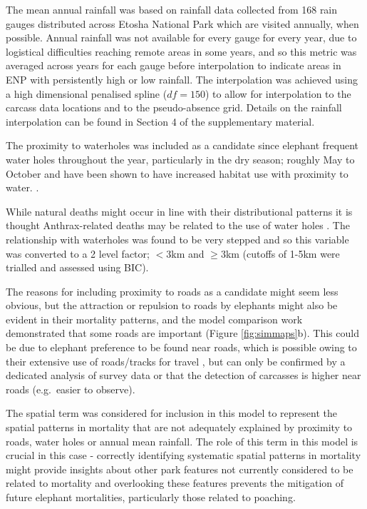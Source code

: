 \documentclass[letterpaper]{interact}
\begin{document}
The mean annual rainfall was based on rainfall data collected from 168 rain gauges distributed across Etosha National Park which are visited annually, when possible. Annual rainfall was not available for every gauge for every year, due to logistical difficulties reaching remote areas in some years, and so this metric was averaged across years for each gauge before interpolation to indicate areas in ENP with persistently high or low rainfall. The interpolation was achieved using a high dimensional penalised spline (\(df=150\)) to allow for interpolation to the carcass data locations and to the pseudo-absence grid. Details on the rainfall interpolation can be found in Section 4 of the supplementary material.

The proximity to waterholes was included as a candidate since elephant frequent water holes throughout the year, particularly in the dry season; roughly May to October \cite{Tsalyuk2019} and have been shown to have increased habitat use with proximity to water. \cite{Harris2008}.

While natural deaths might occur in line with their distributional patterns it is thought Anthrax-related deaths may be related to the use of water holes \cite{zidon2017}. The relationship with waterholes was found to be very stepped and so this variable was converted to a 2 level factor; $<3$km and $\geq 3$km (cutoffs of 1-5km were trialled and assessed using BIC).

The reasons for including proximity to roads as a candidate might seem less obvious, but the attraction or repulsion to roads by elephants might also be evident in their mortality patterns, and the model comparison work demonstrated that some roads are important (Figure \ref{fig:simmaps}b). This could be due to elephant preference to be found near roads, which is possible owing to their extensive use of roads/tracks for travel \cite{Tsalyuk2019}, but can only be confirmed by a dedicated analysis of survey data or that the detection of carcasses is higher near roads (e.g.~easier to observe).

The spatial term was considered for inclusion in this model to represent the spatial patterns in mortality that are not adequately explained by proximity to roads, water holes or annual mean rainfall. The role of this term in this model is crucial in this case - correctly identifying systematic spatial patterns in mortality might provide insights about other park features not currently considered to be related to mortality and overlooking these features prevents the mitigation of future elephant mortalities, particularly those related to poaching.
\end{document}
